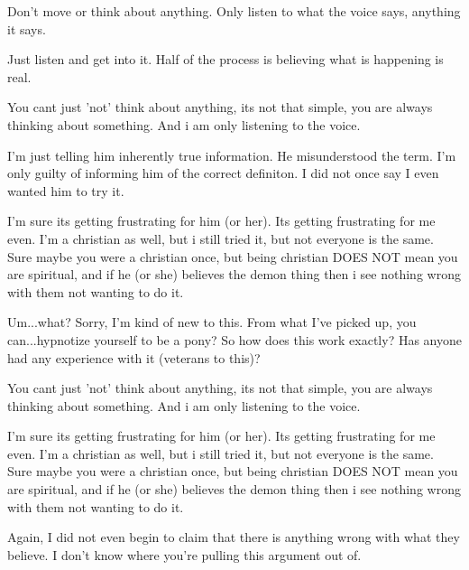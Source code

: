 \documentclass[ebook,12pt,oneside,openany]{memoir}
\newcommand{\mytexttilde}{\raisebox{0.5ex}{\texttildelow}}
\begin{document}
\begin{tcolorbox}[title=The Original,colback=green!5!white,colframe=green!75!black,coltitle=white]
\begin{tcolorbox}[title=Chigens and Kay]
\par{Don't move or think about anything. Only listen to what the voice says, anything it says.}
\newline{}
\par{Just listen and get into it. Half of the process is believing what is happening is real.}
\end{tcolorbox}
\par{You cant just 'not' think about anything, its not that simple, you are always thinking about something. And i am only listening to the voice.}
\newline{}
\begin{tcolorbox}[title=\mytexttilde{}Lawful Aeternae Salvtis\mytexttilde{}]
\par{I'm just telling him inherently true information. He misunderstood the term. I'm only guilty of informing him of the correct definiton. I did not once say I even wanted him to try it.}
\end{tcolorbox}
\par{I'm sure its getting frustrating for him (or her). Its getting frustrating for me even. I'm a christian as well, but i still tried it, but not everyone is the same. Sure maybe you were a christian once, but being christian DOES NOT mean you are spiritual, and if he (or she) believes the demon thing then i see nothing wrong with them not wanting to do it.}
\end{tcolorbox}
\begin{tcolorbox}[title=blackopp1]
\par{Um...what? Sorry, I'm kind of new to this. From what I've picked up, you can...hypnotize yourself to be a pony? So how does this work exactly? Has anyone had any experience with it (veterans to this)?}
\end{tcolorbox}
\begin{tcolorbox}[title=Harmonic Revelations,colback=brown!5!white,colframe=brown!75!black,coltitle=white]
\begin{tcolorbox}[title=Ponyworld Destroyer]
\par{You cant just 'not' think about anything, its not that simple, you are always thinking about something. And i am only listening to the voice.}
\newline{}
\newline{}
\par{I'm sure its getting frustrating for him (or her). Its getting frustrating for me even. I'm a christian as well, but i still tried it, but not everyone is the same. Sure maybe you were a christian once, but being christian DOES NOT mean you are spiritual, and if he (or she) believes the demon thing then i see nothing wrong with them not wanting to do it.}
\end{tcolorbox}
\par{Again, I did not even begin to claim that there is anything wrong with what they believe. I don't know where you're pulling this argument out of.}
\end{tcolorbox}
\end{document}
